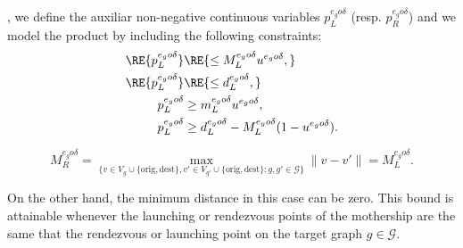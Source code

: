 \noindent
{}, we define the auxiliar non-negative continuous variables $p_L^{e_go\delta}$ (resp. $p_R^{e_go\delta}$) and we model the product by including the following constraints:
\begin{align*}
\RE{p_L^{e_go\delta}} & \RE{\leq  M_L^{e_go\delta}u^{e_go\delta},}\\
\RE{p_L^{e_go\delta}} & \RE{\leq d_L^{e_go\delta},} \\
p_L^{e_go\delta} & \geq m_L^{e_go\delta} u^{e_go\delta}, \\
p_L^{e_go\delta} & \geq d_L^{e_go\delta} - M_L^{e_go\delta}(1-u^{e_go\delta}).
\end{align*}

$$
M_R^{e_go\delta} = \max_{\{v\in V_g\cup\{\text{orig}, \text{dest}\}, v'\in V_{g'}\cup\{\text{orig}, \text{dest}\} : g, g'\in\mathcal G\}} \|v - v'\| = M_L^{e_go\delta}.
$$

\noindent
On the other hand, the minimum distance in this case can be zero. This bound is attainable whenever the launching or rendezvous points of the mothership are the same that the rendezvous or launching point on the target graph $g\in \mathcal{G}$.


